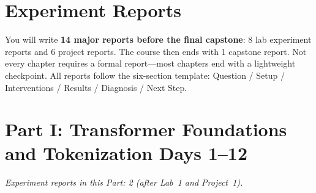 \section*{Experiment Reports}

You will write \textbf{14 major reports before the final capstone}: 8 lab experiment reports and 6 project reports. The course then ends with 1 capstone report. Not every chapter requires a formal report---most chapters end with a lightweight checkpoint. All reports follow the six-section template: Question / Setup / Interventions / Results / Diagnosis / Next Step.

\bigskip

\section*{Part I: Transformer Foundations and Tokenization \hfill Days 1--12}

\medskip
\noindent\textit{Experiment reports in this Part: 2 (after Lab~1 and Project~1).}

